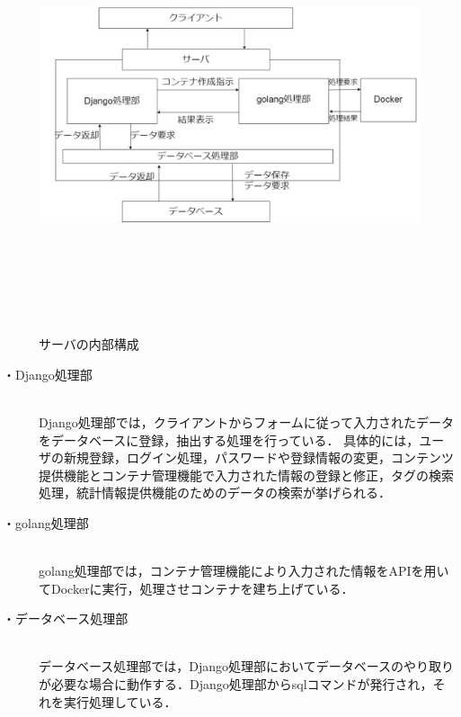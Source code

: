 \begin{figure}[htbp]
    \begin{center}
        \includegraphics[width=13cm,height=12cm,keepaspectratio]{server_arch-crop.pdf}\\
    \end{center}
    \caption{サーバの内部構成}
    \label{server_naibu}
\end{figure}

\begin{description}
    \item[・Django処理部]\mbox{}\\
        Django処理部では，クライアントからフォームに従って入力されたデータをデータベースに登録，抽出する処理を行っている．
        具体的には，ユーザの新規登録，ログイン処理，パスワードや登録情報の変更，コンテンツ提供機能とコンテナ管理機能で入力された情報の登録と修正，タグの検索処理，統計情報提供機能のためのデータの検索が挙げられる．
    \item[・golang処理部]\mbox{}\\
        golang処理部では，コンテナ管理機能により入力された情報をAPIを用いてDockerに実行，処理させコンテナを建ち上げている．
    \item[・データベース処理部]\mbox{}\\
        データベース処理部では，Django処理部においてデータベースのやり取りが必要な場合に動作する．Django処理部からsqlコマンドが発行され，それを実行処理している．
\end{description}

